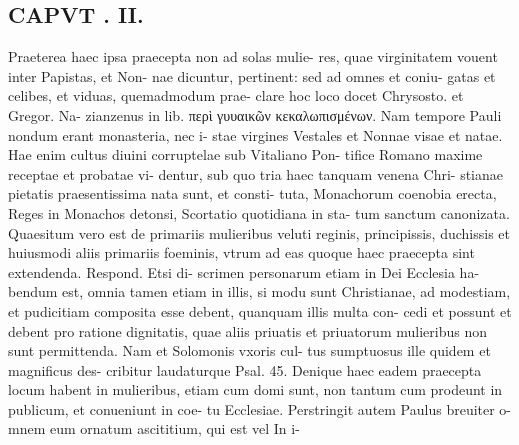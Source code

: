 \documentclass{article}
\begin{document}
\begin{pages}
\section*{CAPVT . II. }
\marginpar{[ p.79 ]}\pstart Praeterea haec ipsa praecepta non ad solas mulie- res, quae virginitatem vouent inter Papistas, et Non- nae dicuntur, pertinent: sed ad omnes et coniu- gatas et celibes, et viduas, quemadmodum prae- clare hoc loco docet Chrysosto. et Gregor. Na- zianzenus in lib.  περὶ γυυαικῶν κεκαλωπισμένων. Nam tempore Pauli nondum erant monasteria, nec i- stae virgines Vestales et Nonnae visae et natae. Hae enim cultus diuini corruptelae sub Vitaliano Pon- tifice Romano maxime receptae et probatae vi- dentur, sub quo tria haec tanquam venena Chri- stianae pietatis praesentissima nata sunt, et consti- tuta, Monachorum coenobia erecta, Reges in Monachos detonsi, Scortatio quotidiana in sta- tum sanctum canonizata. Quaesitum vero est de primariis mulieribus veluti reginis, principissis, duchissis et huiusmodi aliis primariis foeminis, vtrum ad eas quoque haec praecepta sint extendenda. Respond. Etsi di- scrimen personarum etiam in Dei Ecclesia ha- bendum est, omnia tamen etiam in illis, si modu sunt Christianae, ad modestiam, et pudicitiam composita esse debent, quanquam illis multa con- cedi et possunt et debent pro ratione dignitatis, quae aliis priuatis et priuatorum mulieribus non sunt permittenda. Nam et Solomonis vxoris cul- tus sumptuosus ille quidem et magnificus des- cribitur laudaturque Psal. 45. Denique haec eadem praecepta locum habent in mulieribus, etiam cum domi sunt, non tantum cum prodeunt in publicum, et conueniunt in coe- tu Ecclesiae. Perstringit autem Paulus breuiter o- mnem eum ornatum ascititium, qui est vel In i-  \pend

\end{pages}
\end{document}

